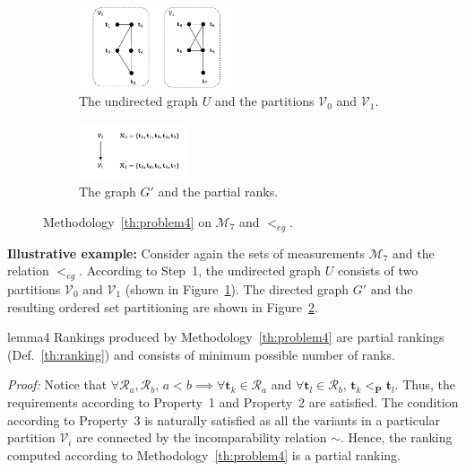 \documentclass[acmsmall,screen, review]{acmart}
\begin{document}
\begin{figure}[h!]
	\centering
	\begin{subfigure}{0.9\textwidth}
		\centering
		\includegraphics[width=0.5\textwidth]{fig/ch3/met4-eg}
		\caption{The undirected graph $U$ and the partitions $\mathcal{V}_0$ and $\mathcal{V}_1$. }
		\label{fig3:met4-eg-udg}
	\end{subfigure}
	\hfill
	\begin{subfigure}{0.9\textwidth}
		\centering
		\includegraphics[width=0.35\textwidth]{fig/ch3/met4-eg-dfg}
		\caption{The graph $G'$ and the partial ranks.}
		\label{fig3:met4-eg-dfg}
	\end{subfigure}
	\caption{Methodology~\ref{th:problem4} on $\mathcal{M}_7$ and $<_{eg}$.  }
	\label{fig3:met4-eg}
\end{figure}

\textbf{Illustrative example:} Consider again the sets of measurements $\mathcal{M}_7$ and the relation $<_{eg}$. According to Step~1, the undirected graph $U$ consists of two partitions $\mathcal{V}_0$ and $\mathcal{V}_1$ (shown in Figure~\ref{fig3:met4-eg-udg}). The directed graph $G'$ and the resulting ordered set partitioning are shown in Figure~\ref{fig3:met4-eg-dfg}.   

\begin{mylem}{}{lemma4}
	Rankings produced by Methodology~\ref{th:problem4} are partial rankings (Def.~\ref{th:ranking}) and consists of minimum possible number of ranks.
\end{mylem}
\textit{Proof:} Notice that $\forall \mathcal{R}_a, \mathcal{R}_b$, $a<b \implies \forall \mathbf{t}_k \in \mathcal{R}_a$ and $ \forall \mathbf{t}_l \in \mathcal{R}_b$, $\mathbf{t}_k <_{\mathbf{P}} \mathbf{t}_l$. Thus, the requirements according to Property~1 and Property~2 are satisfied. The condition according to Property~3 is naturally satisfied as all the variants in a particular partition $\mathcal{V}_i$ are connected by the incomparability relation $\sim$. Hence, the ranking computed according to Methodology~\ref{th:problem4} is a partial ranking.
\end{document}

